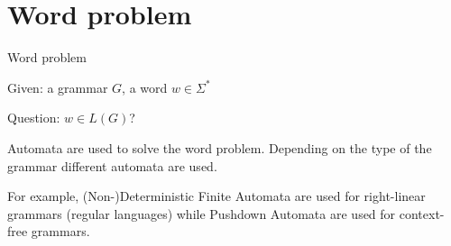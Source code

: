 \documentclass{beamer}
\def\padding{\vspace{0.5cm}}
\begin{document}
\section{Word problem}

\begin{frame}{Word problem}
    \begin{definition}
        Given: a grammar $G$, a word $w \in \Sigma^*$\par
        Question: $w \in L(G)$?
    \end{definition}\pause\padding
    Automata are used to solve the word problem. Depending on the type of the grammar different automata are used.\par
    For example, (Non-)Deterministic Finite Automata are used for right-linear grammars (regular languages) while Pushdown Automata are used for context-free grammars.
\end{frame}
\end{document}

